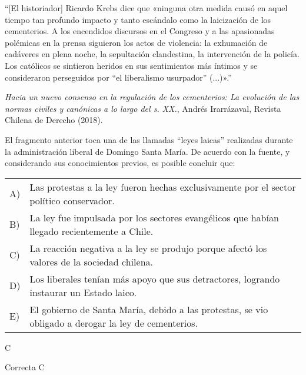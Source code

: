 \documentclass[letterpaper,11pt]{article}
\newcommand{\anchopregunta}{0.9\textwidth}
\begin{document}
\begin{enumerate}
\begin{minipage}{\anchopregunta}
\item ``[El historiador] Ricardo Krebs dice que «ninguna otra medida causó en aquel tiempo tan profundo impacto y tanto escándalo como la laicización de los cementerios. A los encendidos discursos en el Congreso y a las apasionadas polémicas en la prensa siguieron los actos de violencia: la exhumación de cadáveres en plena noche, la sepultación clandestina, la intervención de la policía. Los católicos se sintieron heridos en sus sentimientos más íntimos y se consideraron perseguidos por “el liberalismo usurpador” (...)».''
\begin{flushright}
\textit{Hacia un nuevo consenso en la regulación de los cementerios: La evolución de las normas civiles y canónicas a lo largo del s. XX.}, Andrés Irarrázaval, Revista Chilena de Derecho (2018).
\end{flushright}
El fragmento anterior toca una de las llamadas ``leyes laicas'' realizadas durante la administración liberal de Domingo Santa María. De acuerdo con la fuente, y considerando sus conocimientos previos, es posible concluir que: 
\begin{flushleft}\begin{tabular}{@{\hspace{-.001\textwidth}}l@{\hspace{2pt}}p{}}
A)& Las protestas a la ley fueron hechas exclusivamente por el sector político conservador.\\
B)& La ley fue impulsada por los sectores evangélicos que habían llegado recientemente a Chile.\\
C)& La reacción negativa a la ley se produjo porque afectó los valores de la sociedad chilena.\\
D)& Los liberales tenían más apoyo que sus detractores, logrando instaurar un Estado laico.\\
E)& El gobierno de Santa María, debido a las protestas, se vio obligado a derogar la ley de cementerios.\\ 
\end{tabular}\end{flushleft}%
\begin{key} C
\end{key} 
\begin{hint}
\end{hint}
\begin{answer} Correcta C \\
\end{answer}

\end{minipage}
\end{enumerate}
\end{document}
